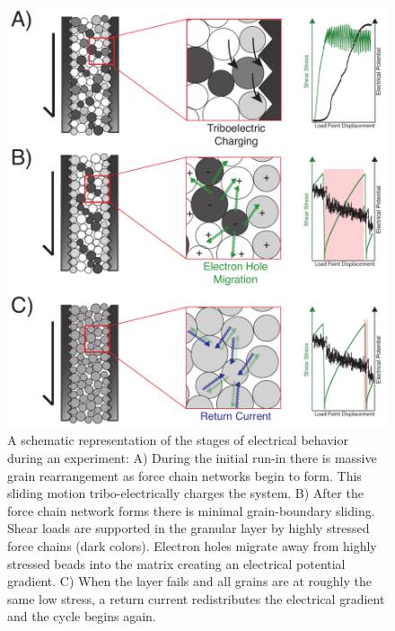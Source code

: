 \begin{figure}
\includegraphics[width=30pc]{chap_electrical/model_cartoon.pdf}
\caption{A schematic representation of the stages of electrical behavior during an experiment:  A) During the initial run-in there is massive grain rearrangement as force chain networks begin to form.  This sliding motion tribo-electrically charges the system.  B) After the force chain network forms there is minimal grain-boundary sliding.  Shear loads are supported in the granular layer by highly stressed force chains (dark colors).  Electron holes migrate away from highly stressed beads into the matrix creating an electrical potential gradient.  C) When the layer fails and all grains are at roughly the same low stress, a return current redistributes the electrical gradient and the cycle begins again.}
\label{model_cartoon}
\end{figure}

\clearpage

